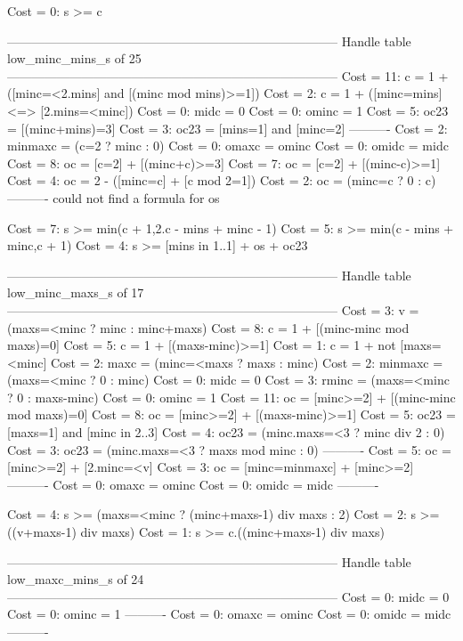 Cost =  0:  s >= c

--------------------------------------------------------------------------------
Handle table low_minc_mins_s of 25
--------------------------------------------------------------------------------
Cost = 11:  c       = 1 + ([minc=<2.mins] and [(minc mod mins)>=1])
Cost =  2:  c       = 1 + ([minc=mins] <=> [2.mins=<minc])
Cost =  0:  midc    = 0
Cost =  0:  ominc   = 1
Cost =  5:  oc23    = [(minc+mins)=3]
Cost =  3:  oc23    = [mins=1] and [minc=2]
----------
Cost =  2:  minmaxc = (c=2 ? minc : 0)
Cost =  0:  omaxc   = ominc
Cost =  0:  omidc   = midc
Cost =  8:  oc      = [c=2] + [(minc+c)>=3]
Cost =  7:  oc      = [c=2] + [(minc-c)>=1]
Cost =  4:  oc      = 2 - ([minc=c] + [c mod 2=1])
Cost =  2:  oc      = (minc=c ? 0 : c)
----------
could not find a formula for os

Cost =  7:  s >= min(c + 1,2.c - mins + minc - 1)
Cost =  5:  s >= min(c - mins + minc,c + 1)
Cost =  4:  s >= [mins in 1..1] + os + oc23

--------------------------------------------------------------------------------
Handle table low_minc_maxs_s of 17
--------------------------------------------------------------------------------
Cost =  3:  v       = (maxs=<minc ? minc : minc+maxs)
Cost =  8:  c       = 1 + [(minc-minc mod maxs)=0]
Cost =  5:  c       = 1 + [(maxs-minc)>=1]
Cost =  1:  c       = 1 + not [maxs=<minc]
Cost =  2:  maxc    = (minc=<maxs ? maxs : minc)
Cost =  2:  minmaxc = (maxs=<minc ? 0 : minc)
Cost =  0:  midc    = 0
Cost =  3:  rminc   = (maxs=<minc ? 0 : maxs-minc)
Cost =  0:  ominc   = 1
Cost = 11:  oc      = [minc>=2] + [(minc-minc mod maxs)=0]
Cost =  8:  oc      = [minc>=2] + [(maxs-minc)>=1]
Cost =  5:  oc23    = [maxs=1] and [minc in 2..3]
Cost =  4:  oc23    = (minc.maxs=<3 ? minc div 2 : 0)
Cost =  3:  oc23    = (minc.maxs=<3 ? maxs mod minc : 0)
----------
Cost =  5:  oc      = [minc>=2] + [2.minc=<v]
Cost =  3:  oc      = [minc=minmaxc] + [minc>=2]
----------
Cost =  0:  omaxc   = ominc
Cost =  0:  omidc   = midc
----------

Cost =  4:  s >= (maxs=<minc ? (minc+maxs-1) div maxs : 2)
Cost =  2:  s >= ((v+maxs-1) div maxs)
Cost =  1:  s >= c.((minc+maxs-1) div maxs)

--------------------------------------------------------------------------------
Handle table low_maxc_mins_s of 24
--------------------------------------------------------------------------------
Cost =  0:  midc  = 0
Cost =  0:  ominc = 1
----------
Cost =  0:  omaxc = ominc
Cost =  0:  omidc = midc
----------

